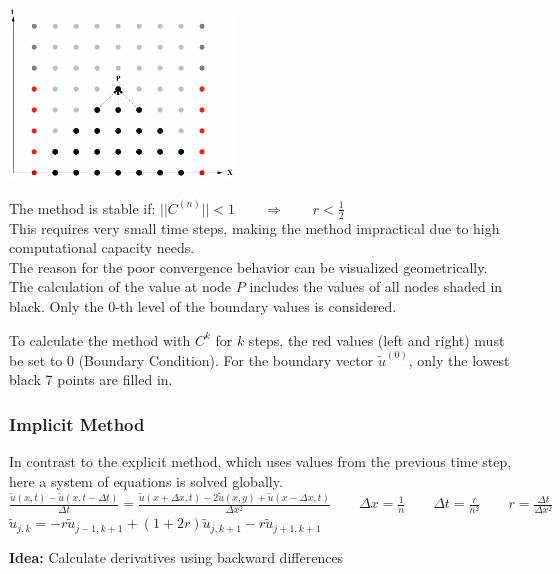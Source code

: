 \begin{minipage}{6cm}
\includegraphics[width=6cm]{Content/02_numerics/KonvExplizit.png}
\end{minipage}
\hfill
\begin{minipage}{12cm}
The method is stable if: $||C^{(n)}|| < 1 \qquad \Rightarrow\qquad r < \frac{1}{2}$\\

This requires very small time steps, making the method impractical due to high computational capacity needs.\\

The reason for the poor convergence behavior can be visualized geometrically. The calculation of the value at node $P$ includes the values of all nodes shaded in black. Only the 0-th level of the boundary values is considered.
\end{minipage}
To calculate the method with $C^k$ for $k$ steps, the red values (left and right) must be set to 0 (Boundary Condition).
For the boundary vector $\tilde{u}^{(0)}$, only the lowest black 7 points are filled in.


\subsubsection{Implicit Method}
In contrast to the explicit method, which uses values from the previous time step, here a system of equations is solved globally.\\

$\boxed{\frac{\tilde{u}(x,t) - \tilde{u}(x,t -\Delta t)}{\Delta t} =
\frac{\tilde{u}(x+\Delta x, t)-2\tilde{u}(x,y) + \tilde{u}( x - \Delta x, t )} {\Delta x^2}}
 \qquad \Delta x=\frac{1}{n} \qquad \Delta t=\frac{r}{n^2} \qquad \boxed{r=\frac{\Delta
t}{\Delta x^2}}$\\

$ \tilde{u}_{j,k} = - r \tilde{u}_{j-1,k+1} + (1+2r)\tilde{u}_{j,k+1} - r \tilde{u}_{j+1,k+1}$

\textbf{Idea:} Calculate derivatives using backward differences\\


